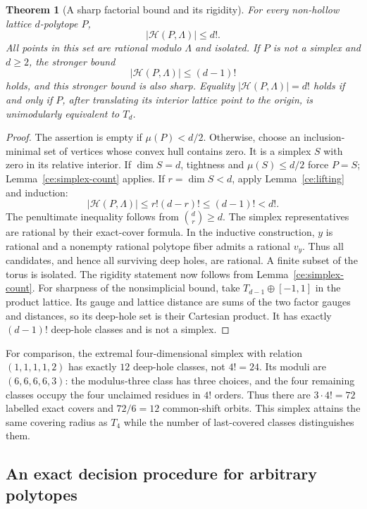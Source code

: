 \documentclass[11pt,a4paper]{article}
\newtheorem{theorem}{Theorem}[section]
\theoremstyle{remark}\newtheorem{remark}[theorem]{Remark}
\begin{document}
\begin{theorem}[A sharp factorial bound and its rigidity]
\label{ce:factorial}
For every non-hollow lattice $d$-polytope $P$,
\[
 |\mathcal H(P,\Lambda)|\le d!.
\]
All points in this set are rational modulo $\Lambda$ and isolated.
If $P$ is not a simplex and $d\ge2$, the stronger bound
\[
 |\mathcal H(P,\Lambda)|\le(d-1)!
\]
holds, and this stronger bound is also sharp.
Equality $|\mathcal H(P,\Lambda)|=d!$ holds if and only if
$P$, after translating its interior lattice point to the origin,
is unimodularly equivalent to $T_d$.
\end{theorem}
\begin{proof}
The assertion is empty if $\mu(P)<d/2$. Otherwise, choose an
inclusion-minimal set of vertices whose convex hull contains zero.
It is a simplex $S$ with zero in its relative interior.
If $\dim S=d$, tightness and $\mu(S)\le d/2$ force $P=S$;
Lemma~\ref{ce:simplex-count} applies.
If $r=\dim S<d$, apply Lemma~\ref{ce:lifting} and induction:
\[
 |\mathcal H(P,\Lambda)|\le r!(d-r)!\le(d-1)!<d!.
\]
The penultimate inequality follows from $\binom dr\ge d$.
The simplex representatives are rational by their exact-cover
formula. In the inductive construction, $y$ is rational and a
nonempty rational polytope fiber admits a rational $v_y$.
Thus all candidates, and hence all surviving deep holes, are
rational. A finite subset of the torus is isolated. The rigidity
statement now follows from Lemma~\ref{ce:simplex-count}.
For sharpness of the nonsimplicial bound, take
$T_{d-1}\oplus[-1,1]$ in the product lattice. Its gauge and
lattice distance are sums of the two factor gauges and distances,
so its deep-hole set is their Cartesian product. It has exactly
$(d-1)!$ deep-hole classes and is not a simplex.
\end{proof}

For comparison, the extremal four-dimensional simplex with relation
$(1,1,1,1,2)$ has exactly $12$ deep-hole classes, not $4!=24$.
Its moduli are $(6,6,6,6,3)$: the modulus-three class has three
choices, and the four remaining classes occupy the four unclaimed
residues in $4!$ orders. Thus there are $3\cdot4!=72$ labelled
exact covers and $72/6=12$ common-shift orbits. This simplex
attains the same covering radius as $T_4$ while the number of
last-covered classes distinguishes them.

\subsection{An exact decision procedure for arbitrary polytopes}
\end{document}
